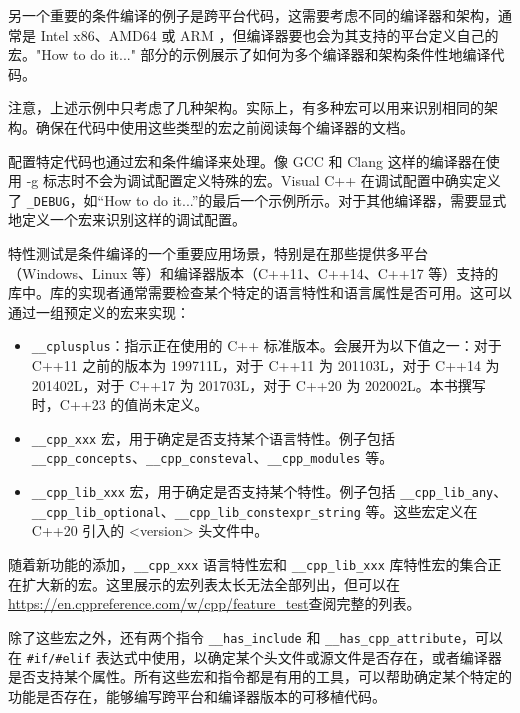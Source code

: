 另一个重要的条件编译的例子是跨平台代码，这需要考虑不同的编译器和架构，通常是 Intel x86、AMD64 或 ARM ，但编译器要也会为其支持的平台定义自己的宏。"How to do it..." 部分的示例展示了如何为多个编译器和架构条件性地编译代码。

\begin{myNotic}
注意，上述示例中只考虑了几种架构。实际上，有多种宏可以用来识别相同的架构。确保在代码中使用这些类型的宏之前阅读每个编译器的文档。
\end{myNotic}

配置特定代码也通过宏和条件编译来处理。像 GCC 和 Clang 这样的编译器在使用 -g 标志时不会为调试配置定义特殊的宏。Visual C++ 在调试配置中确实定义了 \verb|_DEBUG|，如“How to do it...”的最后一个示例所示。对于其他编译器，需要显式地定义一个宏来识别这样的调试配置。

特性测试是条件编译的一个重要应用场景，特别是在那些提供多平台（Windows、Linux 等）和编译器版本（C++11、C++14、C++17 等）支持的库中。库的实现者通常需要检查某个特定的语言特性和语言属性是否可用。这可以通过一组预定义的宏来实现：

\begin{itemize}
\item
\verb|__cplusplus|：指示正在使用的 C++ 标准版本。会展开为以下值之一：对于 C++11 之前的版本为 199711L，对于 C++11 为 201103L，对于 C++14 为 201402L，对于 C++17 为 201703L，对于 C++20 为 202002L。本书撰写时，C++23 的值尚未定义。

\item
\verb|__cpp_xxx| 宏，用于确定是否支持某个语言特性。例子包括 \verb|__cpp_concepts|、\verb|__cpp_consteval|、\verb|__cpp_modules| 等。

\item
\verb|__cpp_lib_xxx| 宏，用于确定是否支持某个特性。例子包括 \verb|__cpp_lib_any|、\verb|__cpp_lib_optional|、\verb|__cpp_lib_constexpr_string| 等。这些宏定义在 C++20 引入的 <version> 头文件中。
\end{itemize}

随着新功能的添加，\verb|__cpp_xxx| 语言特性宏和 \verb|__cpp_lib_xxx| 库特性宏的集合正在扩大新的宏。这里展示的宏列表太长无法全部列出，但可以在 \url{https://en.cppreference.com/w/cpp/feature_test}查阅完整的列表。

除了这些宏之外，还有两个指令 \verb|__has_include| 和 \verb|__has_cpp_attribute|，可以在 \verb|#if/#elif| 表达式中使用，以确定某个头文件或源文件是否存在，或者编译器是否支持某个属性。所有这些宏和指令都是有用的工具，可以帮助确定某个特定的功能是否存在，能够编写跨平台和编译器版本的可移植代码。

